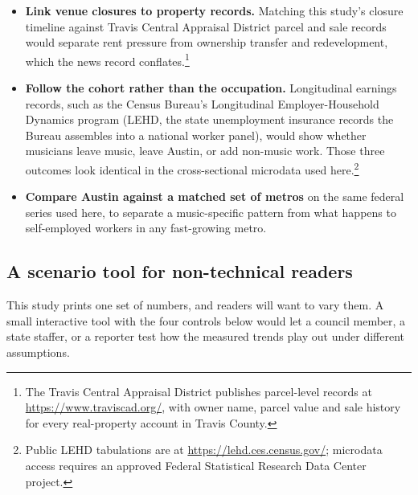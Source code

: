 \begin{itemize}
\item \textbf{Link venue closures to property records.} Matching this study's
      closure timeline against Travis Central Appraisal District parcel and
      sale records would separate rent pressure from ownership transfer and
      redevelopment, which the news record conflates.\footnote{The Travis
      Central Appraisal District publishes parcel-level records at
      \url{https://www.traviscad.org/}, with owner name, parcel value and
      sale history for every real-property account in Travis County.}
\item \textbf{Follow the cohort rather than the occupation.} Longitudinal
      earnings records, such as the Census Bureau's Longitudinal
      Employer-Household Dynamics program (LEHD, the state unemployment
      insurance records the Bureau assembles into a national worker panel),
      would show whether musicians leave music, leave Austin, or add non-music
      work. Those three outcomes look identical in the cross-sectional
      microdata used here.\footnote{Public LEHD tabulations are at
      \url{https://lehd.ces.census.gov/}; microdata access requires an
      approved Federal Statistical Research Data Center project.}
\item \textbf{Compare Austin against a matched set of metros} on the same
      federal series used here, to separate a music-specific pattern from
      what happens to self-employed workers in any fast-growing metro.
\end{itemize}

\subsection*{A scenario tool for non-technical readers}

This study prints one set of numbers, and readers will want to vary them. A
small interactive tool with the four controls below would let a council
member, a state staffer, or a reporter test how the measured trends play out
under different assumptions.

